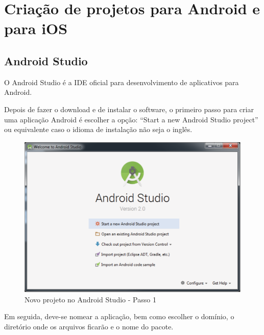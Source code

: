 \newpage 
\section{Criação de projetos para Android e para iOS}
\subsection{Android Studio}
O Android Studio é a IDE oficial para desenvolvimento de aplicativos para 
Android.

Depois de fazer o download e de instalar o software, o primeiro passo 
para criar uma aplicação Android é escolher a opção: 
\enquote{Start a new Android Studio project} ou equivalente caso o idioma de instalação 
não seja o inglês.

\begin{figure}[H]
    \centering
    \includegraphics[scale=0.8]{images/android_studio_1}
    \caption[Novo projeto no Android Studio - Passo 1]
    {Novo projeto no Android Studio - Passo 1 \cite{DiMarzio2016}}
    \label{fig:android_studio_1}
\end{figure}

Em seguida, deve-se nomear a aplicação, bem como escolher o domínio,
o diretório onde os arquivos ficarão e o nome do pacote.

